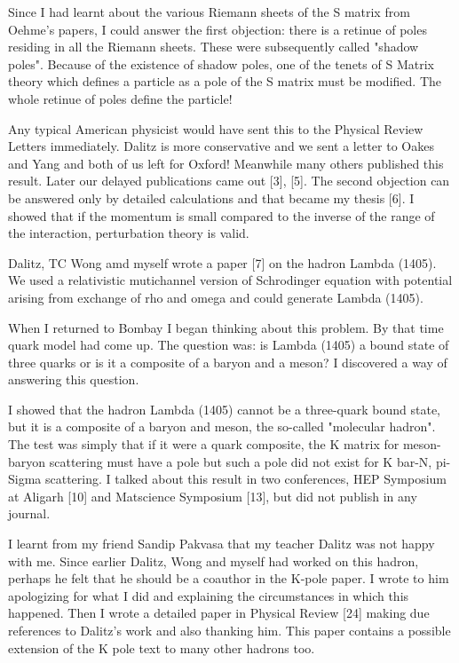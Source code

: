 Since I had learnt about the various Riemann sheets of the S matrix from 
Oehme's papers, I could answer the first objection: there is a retinue 
of poles residing in all the Riemann sheets. These were subsequently 
called "shadow poles". Because of the existence of shadow poles, one of 
the tenets of S Matrix theory which defines a particle as a pole of the 
S matrix must be modified. The whole retinue of poles define the 
particle!

Any typical American physicist would have sent this to the Physical 
Review Letters immediately. Dalitz is more conservative and we sent a 
letter to Oakes and Yang and both of us left for Oxford! Meanwhile many 
others published this result. Later our delayed publications came out 
[3], [5]. The second objection can be answered only by detailed 
calculations and that became my thesis [6]. I showed that if the momentum 
is small compared to the inverse of the range of the interaction, 
perturbation theory is valid.

Dalitz, TC Wong amd myself wrote a paper [7] on the hadron Lambda 
(1405). We used a relativistic mutichannel version of Schrodinger 
equation with potential arising from exchange of rho and omega and could 
generate Lambda (1405).

When I returned to Bombay I began thinking about this problem. By that 
time quark model had come up. The question was: is Lambda (1405) a bound 
state of three quarks or is it a composite of a baryon and a meson? I 
discovered a way of answering this question.

I showed that the hadron Lambda (1405) cannot be a three-quark bound 
state, but it is a composite of a baryon and meson, the so-called 
"molecular hadron". The test was simply that if it were a quark 
composite, the K matrix for meson-baryon scattering must have a pole but 
such a pole did not exist for K bar-N, pi-Sigma scattering. I talked 
about this result in two conferences, HEP Symposium at Aligarh [10] and 
Matscience Symposium [13], but did not publish in any journal.

I learnt from my friend Sandip Pakvasa that my teacher Dalitz was not 
happy with me. Since earlier Dalitz, Wong and myself had worked on this 
hadron, perhaps he felt that he should be a coauthor in the K-pole 
paper. I wrote to him apologizing for what I did and explaining the 
circumstances in which this happened. Then I wrote a detailed paper in 
Physical Review [24] making due references to Dalitz's work and also 
thanking him. This paper contains a possible extension of the K pole 
text to many other hadrons too.

